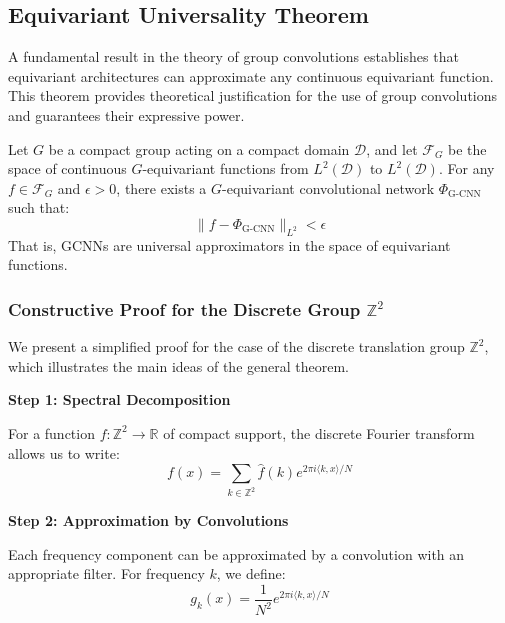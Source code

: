 \subsection{Equivariant Universality Theorem}\label{subsec:teorema_universalidad_equivariante}

A fundamental result in the theory of group convolutions establishes that equivariant architectures can approximate any continuous equivariant function. This theorem provides theoretical justification for the use of group convolutions and guarantees their expressive power.

\begin{theorem}\label{theorem:equivariant_universality_cnns}
    Let $G$ be a compact group acting on a compact domain $\mathcal{D}$, and let $\mathcal{F}_G$ be the space of continuous $G$-equivariant functions from $L^2(\mathcal{D})$ to $L^2(\mathcal{D})$. For any $f \in \mathcal{F}_G$ and $\epsilon > 0$, there exists a $G$-equivariant convolutional network $\Phi_{\text{G-CNN}}$ such that:
    \begin{equation}
        \|f - \Phi_{\text{G-CNN}}\|_{L^2} < \epsilon
    \end{equation}
    That is, \glspl{GCNN} are universal approximators in the space of equivariant functions.
\end{theorem}

\subsubsection{Constructive Proof for the Discrete Group $\mathbb{Z}^2$}

We present a simplified proof for the case of the discrete translation group $\mathbb{Z}^2$, which illustrates the main ideas of the general theorem.

\textbf{Step 1: Spectral Decomposition}

For a function $f: \mathbb{Z}^2 \to \mathbb{R}$ of compact support, the discrete Fourier transform allows us to write:
\begin{equation}
    f(x) = \sum_{k \in \mathbb{Z}^2} \hat{f}(k) e^{2\pi i \langle k, x \rangle / N}
\end{equation}

\textbf{Step 2: Approximation by Convolutions}

Each frequency component can be approximated by a convolution with an appropriate filter. For frequency $k$, we define:
\begin{equation}
    g_k(x) = \frac{1}{N^2} e^{2\pi i \langle k, x \rangle / N}
\end{equation}

